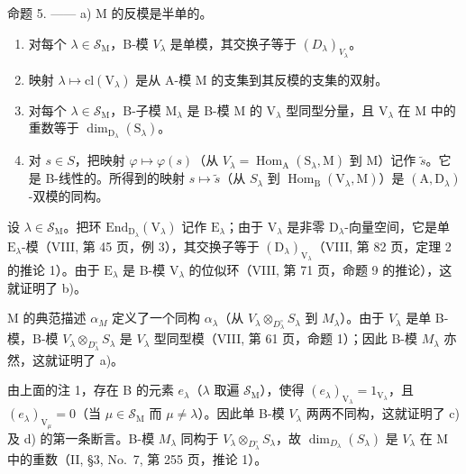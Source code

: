 命题 5. —— a) M 的反模是半单的。

\begin{enumerate}
\def\labelenumi{\alph{enumi})}
\setcounter{enumi}{1}
\item
  对每个 \(\lambda \in \mathcal{S}_{\mathrm{M}}\)，B-模 \(V_{\lambda}\) 是单模，其交换子等于 \((D_{\lambda})_{V_{\lambda}}\)。
\item
  映射 \(\lambda \mapsto \mathrm{cl}(\mathrm{V}_{\lambda})\) 是从 A-模 M 的支集到其反模的支集的双射。
\item
  对每个 \(\lambda \in \mathcal{S}_{\mathrm{M}}\)，B-子模 \(\mathrm{M}_{\lambda}\) 是 B-模 M 的 \(\mathrm{V}_{\lambda}\) 型同型分量，且 \(\mathrm{V}_{\lambda}\) 在 M 中的重数等于 \(\dim_{\mathrm{D}_{\lambda}}(\mathrm{S}_{\lambda})\)。
\item
  对 \(s \in S\)，把映射 \(\varphi \mapsto \varphi(s)\)（从 \(V_{\lambda} = \operatorname{Hom}_{\mathrm{A}}(\mathrm{S}_{\lambda}, \mathrm{M})\) 到 M）记作 \(\widetilde{s}\)。它是 B-线性的。所得到的映射 \(s \mapsto \widetilde{s}\)（从 \(S_{\lambda}\) 到 \(\operatorname{Hom}_{\mathrm{B}}(\mathrm{V}_{\lambda}, \mathrm{M})\)）是 \((\mathrm{A}, \mathrm{D}_{\lambda})\)-双模的同构。
\end{enumerate}

设 \(\lambda \in \mathcal{S}_{\mathrm{M}}\)。把环 \(\mathrm{End}_{\mathrm{D}_{\lambda}}(\mathrm{V}_{\lambda})\) 记作 \(\mathrm{E}_{\lambda}\)；由于 \(\mathrm{V}_{\lambda}\) 是非零 \(\mathrm{D}_{\lambda}\)-向量空间，它是单 \(\mathrm{E}_{\lambda}\)-模（VIII, 第 45 页，例 3），其交换子等于 \((\mathrm{D}_{\lambda})_{\mathrm{V}_{\lambda}}\)（VIII, 第 82 页，定理 2 的推论 1）。由于 \(\mathrm{E}_{\lambda}\) 是 B-模 \(\mathrm{V}_{\lambda}\) 的位似环（VIII, 第 71 页，命题 9 的推论），这就证明了 b)。

M 的典范描述 \(\alpha_{M}\) 定义了一个同构 \(\alpha_{\lambda}\)（从 \(V_{\lambda}\otimes_{D_{\lambda}^{\circ}}S_{\lambda}\) 到 \(M_{\lambda}\)）。由于 \(V_{\lambda}\) 是单 B-模，B-模 \(V_{\lambda}\otimes_{D_{\lambda}^{\circ}}S_{\lambda}\) 是 \(V_{\lambda}\) 型同型模（VIII, 第 61 页，命题 1）；因此 B-模 \(M_{\lambda}\) 亦然，这就证明了 a)。

由上面的注 1，存在 B 的元素 \(e_{\lambda}\)（\(\lambda\) 取遍 \(\mathcal{S}_{\mathrm{M}}\)），使得 \((e_{\lambda})_{\mathrm{V}_{\lambda}} = 1_{\mathrm{V}_{\lambda}}\)，且 \((e_{\lambda})_{\mathrm{V}_{\mu}} = 0\)（当 \(\mu \in \mathcal{S}_{\mathrm{M}}\) 而 \(\mu \neq \lambda\)）。因此单 B-模 \(V_{\lambda}\) 两两不同构，这就证明了 c) 及 d) 的第一条断言。B-模 \(M_{\lambda}\) 同构于 \(V_{\lambda} \otimes_{D_{\lambda}^{\circ}} S_{\lambda}\)，故 \(\dim_{D_{\lambda}}(S_{\lambda})\) 是 \(V_{\lambda}\) 在 M 中的重数（II, §3, No.~7, 第 255 页，推论 1）。

